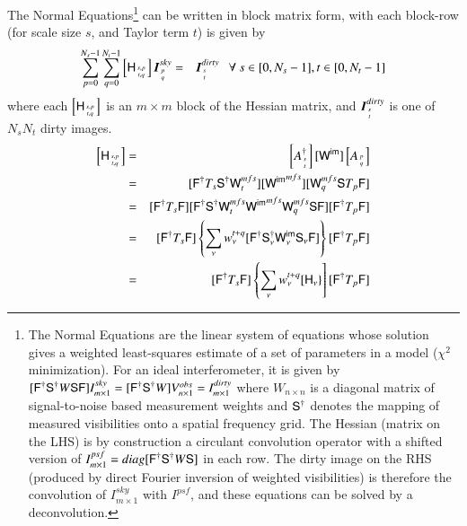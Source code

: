 \documentclass[structabstract]{stylefiles/aa}
\newcommand{\F}{{\tens{F}}}
\newcommand{\Fd}{{\tens{F^\dag}}}
\newcommand{\He}{{\tens{H}}}
\newcommand{\Sa}{{\tens{S}}}
\newcommand{\Sd}{{\tens{S^\dag}}}
\newcommand{\Sna}{\tens{{S_{\nu}}}}
\newcommand{\Snd}{\tens{{S_{\nu}^\dag}}}
\newcommand{\W}{{\tens{W}}}
\newcommand{\Wim}{{\tens{W^{im}}}}
\newcommand{\Wimn}{{\tens{W^{im}_{\nu}}}}
\newcommand{\wntq}{{w_{\nu}^{t+q}}}
\begin{document}
The {Normal Equations\footnote
{\label{FN:Neqn}
The Normal Equations are the linear system of equations whose solution 
gives a weighted least-squares estimate of a set of parameters in a model  
($\chi^2$ minimization). 
For an ideal interferometer, it is given by 
$[\Fd \Sd W \Sa \F ] I^{sky}_{m\times 1} = [\Fd \Sd W] V^{obs}_{n\times 1} = I^{dirty}_{m\times 1}$
where $W_{n\times n}$ is a diagonal matrix of signal-to-noise based measurement weights
and $\Sd$ denotes the mapping of measured visibilities onto a spatial frequency grid.
The Hessian (matrix on the LHS) is by construction a circulant { convolution} operator with 
a shifted version of $I^{psf}_{m\times 1} = diag[\Fd \Sd W \Sa]$ in each row. 
The {dirty} image on the RHS (produced by direct Fourier inversion of weighted visibilities)
is therefore the convolution of $I^{sky}_{m\times 1}$ with $I^{psf}$,
and these equations can be solved by a {deconvolution}. 
}
}
can be written in block matrix form, with each block-row 
(for scale size $s$, and Taylor term $t$) is given by
\begin{eqnarray}
\label{Eq:msmfs_neqn_1}
\sum_{p=0}^{N_s-1}\sum_{q=0}^{N_t-1} \left[\He_{{s,p}\atop{t,q}}\right] \vec{I}^{sky}_{{p}\atop{q}} &=& \vec{I}^{dirty}_{{s}\atop{t}}~~~  \forall~ s \in [0,N_s-1], t\in[0,N_t-1]
\end{eqnarray}
where each $\left[\He_{{s,p}\atop{t,q}} \right]$ is an $m\times m$ block of the 
Hessian matrix, and $\vec{I}^{dirty}_{{s}\atop{t}}$ is one of $N_s N_t$ dirty images.
\begin{eqnarray}
\left[\He_{{s,p}\atop{t,q}} \right] &=& \left[A_{{s}\atop{t}}^{\dag}\right][\Wim] \left[A_{{p}\atop{q}}\right] \\
 &=&    [\Fd T_s  \Sd \W^{mfs}_t]  [\Wim^{mfs}]  [\W^{mfs}_q \Sa T_p \F] \\
 &=&    [\Fd T_s \F] [\Fd  \Sd \W^{mfs}_t  \Wim^{mfs}  \W^{mfs}_q \Sa  \F] [\Fd T_p \F]\\
 &=& [\Fd T_s \F] \left\{  \sum_{\nu} \wntq [\Fd\Snd\Wimn\Sna\F] \right\} [\Fd T_p \F] \\
 &=& [\Fd T_s \F] \left\{  \sum_{\nu} \wntq [\He_{\nu}\} \right] [\Fd T_p \F]
\end{eqnarray}
\end{document}
